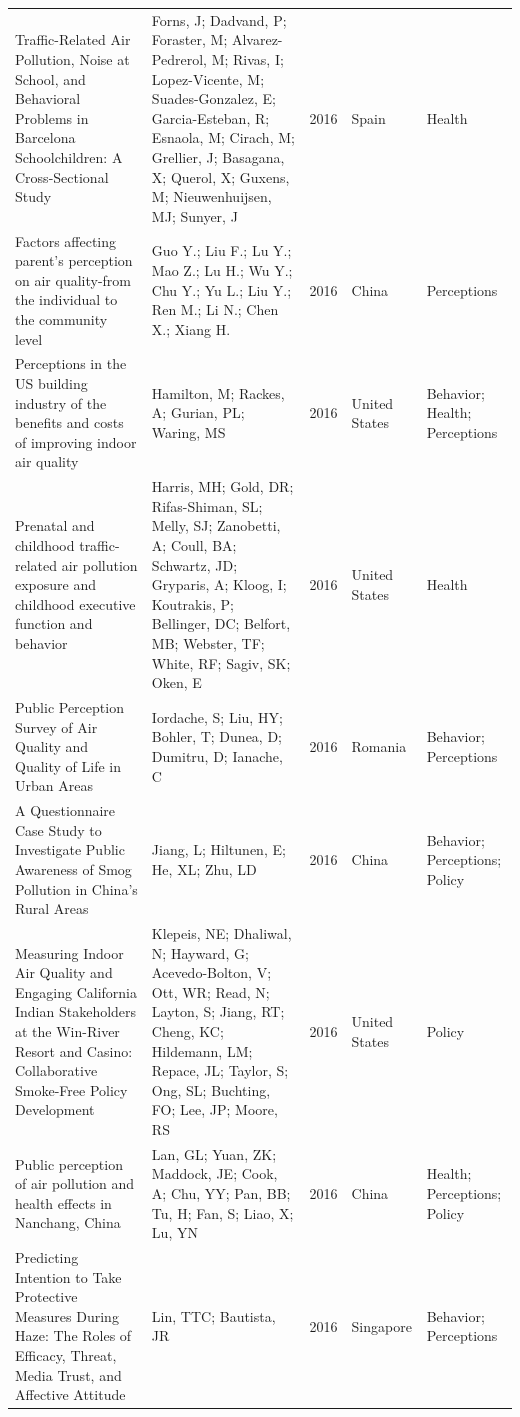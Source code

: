 {\begin{longtable}[t]{p{6cm}p{3cm}lp{3cm}p{3cm}}
Traffic-Related Air Pollution, Noise at School, and Behavioral Problems in Barcelona Schoolchildren: A Cross-Sectional Study & Forns, J; Dadvand, P; Foraster, M; Alvarez-Pedrerol, M; Rivas, I; Lopez-Vicente, M; Suades-Gonzalez, E; Garcia-Esteban, R; Esnaola, M; Cirach, M; Grellier, J; Basagana, X; Querol, X; Guxens, M; Nieuwenhuijsen, MJ; Sunyer, J & 2016 & Spain & Health\\
Factors affecting parent's perception on air quality-from the individual to the community level & Guo Y.; Liu F.; Lu Y.; Mao Z.; Lu H.; Wu Y.; Chu Y.; Yu L.; Liu Y.; Ren M.; Li N.; Chen X.; Xiang H. & 2016 & China & Perceptions\\
Perceptions in the US building industry of the benefits and costs of improving indoor air quality & Hamilton, M; Rackes, A; Gurian, PL; Waring, MS & 2016 & United States & Behavior; Health; Perceptions\\
Prenatal and childhood traffic-related air pollution exposure and childhood executive function and behavior & Harris, MH; Gold, DR; Rifas-Shiman, SL; Melly, SJ; Zanobetti, A; Coull, BA; Schwartz, JD; Gryparis, A; Kloog, I; Koutrakis, P; Bellinger, DC; Belfort, MB; Webster, TF; White, RF; Sagiv, SK; Oken, E & 2016 & United States & Health\\
\addlinespace
Public Perception Survey of Air Quality and Quality of Life in Urban Areas & Iordache, S; Liu, HY; Bohler, T; Dunea, D; Dumitru, D; Ianache, C & 2016 & Romania & Behavior; Perceptions\\
A Questionnaire Case Study to Investigate Public Awareness of Smog Pollution in China's Rural Areas & Jiang, L; Hiltunen, E; He, XL; Zhu, LD & 2016 & China & Behavior; Perceptions; Policy\\
Measuring Indoor Air Quality and Engaging California Indian Stakeholders at the Win-River Resort and Casino: Collaborative Smoke-Free Policy Development & Klepeis, NE; Dhaliwal, N; Hayward, G; Acevedo-Bolton, V; Ott, WR; Read, N; Layton, S; Jiang, RT; Cheng, KC; Hildemann, LM; Repace, JL; Taylor, S; Ong, SL; Buchting, FO; Lee, JP; Moore, RS & 2016 & United States & Policy\\
Public perception of air pollution and health effects in Nanchang, China & Lan, GL; Yuan, ZK; Maddock, JE; Cook, A; Chu, YY; Pan, BB; Tu, H; Fan, S; Liao, X; Lu, YN & 2016 & China & Health; Perceptions; Policy\\
Predicting Intention to Take Protective Measures During Haze: The Roles of Efficacy, Threat, Media Trust, and Affective Attitude & Lin, TTC; Bautista, JR & 2016 & Singapore & Behavior; Perceptions\\

\end{longtable}}
